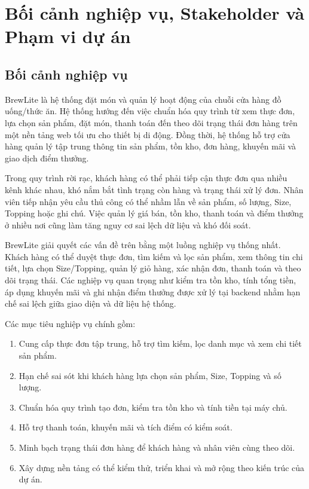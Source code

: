 \section{Bối cảnh nghiệp vụ, Stakeholder và Phạm vi dự án}

\subsection{Bối cảnh nghiệp vụ}

BrewLite là hệ thống đặt món và quản lý hoạt động của chuỗi cửa hàng đồ uống/thức ăn. Hệ thống hướng đến việc chuẩn hóa quy trình từ xem thực đơn, lựa chọn sản phẩm, đặt món, thanh toán đến theo dõi trạng thái đơn hàng trên một nền tảng web tối ưu cho thiết bị di động. Đồng thời, hệ thống hỗ trợ cửa hàng quản lý tập trung thông tin sản phẩm, tồn kho, đơn hàng, khuyến mãi và giao dịch điểm thưởng.

Trong quy trình rời rạc, khách hàng có thể phải tiếp cận thực đơn qua nhiều kênh khác nhau, khó nắm bắt tình trạng còn hàng và trạng thái xử lý đơn. Nhân viên tiếp nhận yêu cầu thủ công có thể nhầm lẫn về sản phẩm, số lượng, Size, Topping hoặc ghi chú. Việc quản lý giá bán, tồn kho, thanh toán và điểm thưởng ở nhiều nơi cũng làm tăng nguy cơ sai lệch dữ liệu và khó đối soát.

BrewLite giải quyết các vấn đề trên bằng một luồng nghiệp vụ thống nhất. Khách hàng có thể duyệt thực đơn, tìm kiếm và lọc sản phẩm, xem thông tin chi tiết, lựa chọn Size/Topping, quản lý giỏ hàng, xác nhận đơn, thanh toán và theo dõi trạng thái. Các nghiệp vụ quan trọng như kiểm tra tồn kho, tính tổng tiền, áp dụng khuyến mãi và ghi nhận điểm thưởng được xử lý tại backend nhằm hạn chế sai lệch giữa giao diện và dữ liệu hệ thống.

Các mục tiêu nghiệp vụ chính gồm:
\begin{enumerate}
    \item Cung cấp thực đơn tập trung, hỗ trợ tìm kiếm, lọc danh mục và xem chi tiết sản phẩm.
    \item Hạn chế sai sót khi khách hàng lựa chọn sản phẩm, Size, Topping và số lượng.
    \item Chuẩn hóa quy trình tạo đơn, kiểm tra tồn kho và tính tiền tại máy chủ.
    \item Hỗ trợ thanh toán, khuyến mãi và tích điểm có kiểm soát.
    \item Minh bạch trạng thái đơn hàng để khách hàng và nhân viên cùng theo dõi.
    \item Xây dựng nền tảng có thể kiểm thử, triển khai và mở rộng theo kiến trúc của dự án.
\end{enumerate}

